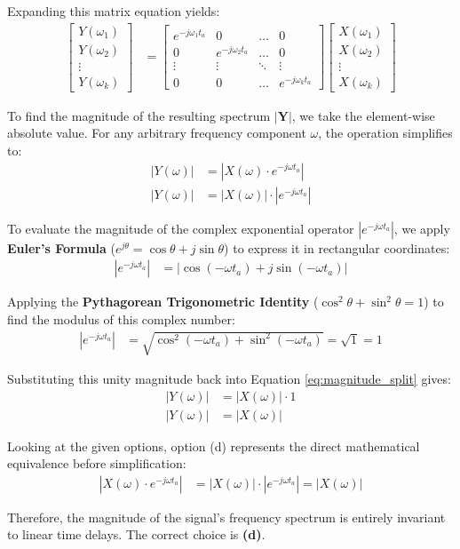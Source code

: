 \documentclass[journal,12pt,onecolumn]{IEEEtran}
\theoremstyle{remark}
\begin{document}
Expanding this matrix equation yields:
\begin{align}
    \begin{bmatrix} Y(\omega_1) \\ Y(\omega_2) \\ \vdots \\ Y(\omega_k) \end{bmatrix}
    &=
    \begin{bmatrix}
    e^{-j\omega_1 t_a} & 0 & \dots & 0 \\
    0 & e^{-j\omega_2 t_a} & \dots & 0 \\
    \vdots & \vdots & \ddots & \vdots \\
    0 & 0 & \dots & e^{-j\omega_k t_a}
    \end{bmatrix}
    \begin{bmatrix} X(\omega_1) \\ X(\omega_2) \\ \vdots \\ X(\omega_k) \end{bmatrix}
\end{align}

To find the magnitude of the resulting spectrum $|\mathbf{Y}|$, we take the element-wise absolute value. For any arbitrary frequency component $\omega$, the operation simplifies to:
\begin{align}
    |Y(\omega)| &= |X(\omega) \cdot e^{-j\omega t_a}| \\
    |Y(\omega)| &= |X(\omega)| \cdot |e^{-j\omega t_a}| \label{eq:magnitude_split}
\end{align}

To evaluate the magnitude of the complex exponential operator $|e^{-j\omega t_a}|$, we apply \textbf{Euler's Formula} ($e^{j\theta} = \cos\theta + j\sin\theta$) to express it in rectangular coordinates:
\begin{align}
    |e^{-j\omega t_a}| &= |\cos(-\omega t_a) + j\sin(-\omega t_a)|
\end{align}

Applying the \textbf{Pythagorean Trigonometric Identity} ($\cos^2\theta + \sin^2\theta = 1$) to find the modulus of this complex number:
\begin{align}
    |e^{-j\omega t_a}| &= \sqrt{\cos^2(-\omega t_a) + \sin^2(-\omega t_a)} = \sqrt{1} = 1
\end{align}

Substituting this unity magnitude back into Equation \eqref{eq:magnitude_split} gives:
\begin{align}
    |Y(\omega)| &= |X(\omega)| \cdot 1 \\
    |Y(\omega)| &= |X(\omega)|
\end{align}

Looking at the given options, option (d) represents the direct mathematical equivalence before simplification:
\begin{align}
    |X(\omega) \cdot e^{-j\omega t_a}| &= |X(\omega)| \cdot |e^{-j\omega t_a}| = |X(\omega)|
\end{align}

Therefore, the magnitude of the signal's frequency spectrum is entirely invariant to linear time delays. The correct choice is \textbf{(d)}.
\end{document}
